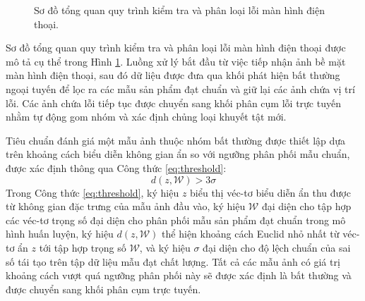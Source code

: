 \begin{figure}[htbp]
\centering
{}
\caption{Sơ đồ tổng quan quy trình kiểm tra và phân loại lỗi màn hình điện thoại.}
\label{fig:quy_trinh_tong_quan}
\end{figure}

Sơ đồ tổng quan quy trình kiểm tra và phân loại lỗi màn hình điện thoại được mô tả cụ thể trong Hình \ref{fig:quy_trinh_tong_quan}. Luồng xử lý bắt đầu từ việc tiếp nhận ảnh bề mặt màn hình điện thoại, sau đó dữ liệu được đưa qua khối phát hiện bất thường ngoại tuyến để lọc ra các mẫu sản phẩm đạt chuẩn và giữ lại các ảnh chứa vị trí lỗi. Các ảnh chứa lỗi tiếp tục được chuyển sang khối phân cụm lỗi trực tuyến nhằm tự động gom nhóm và xác định chủng loại khuyết tật mới.

Tiêu chuẩn đánh giá một mẫu ảnh thuộc nhóm bất thường được thiết lập dựa trên khoảng cách biểu diễn không gian ẩn so với ngưỡng phân phối mẫu chuẩn, được xác định thông qua Công thức \ref{eq:threshold}:
\begin{equation}
d(z, \mathcal{W}) > 3\sigma
\label{eq:threshold}
\end{equation}
Trong Công thức \ref{eq:threshold}, ký hiệu $z$ biểu thị véc-tơ biểu diễn ẩn thu được từ không gian đặc trưng của mẫu ảnh đầu vào, ký hiệu $\mathcal{W}$ đại diện cho tập hợp các véc-tơ trọng số đại diện cho phân phối mẫu sản phẩm đạt chuẩn trong mô hình huấn luyện, ký hiệu $d(z, \mathcal{W})$ thể hiện khoảng cách Euclid nhỏ nhất từ véc-tơ ẩn $z$ tới tập hợp trọng số $\mathcal{W}$, và ký hiệu $\sigma$ đại diện cho độ lệch chuẩn của sai số tái tạo trên tập dữ liệu mẫu đạt chất lượng. Tất cả các mẫu ảnh có giá trị khoảng cách vượt quá ngưỡng phân phối này sẽ được xác định là bất thường và được chuyển sang khối phân cụm trực tuyến.

